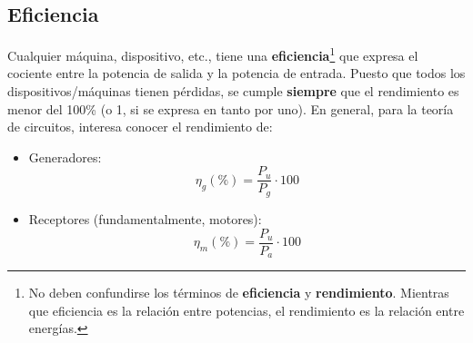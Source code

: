 	\subsection{Eficiencia}
	Cualquier máquina, dispositivo, etc., tiene una
        \textbf{eficiencia}\footnote{No deben confundirse los términos
          de \textbf{eficiencia} y \textbf{rendimiento}. Mientras que
          eficiencia es la relación entre potencias, el rendimiento es
          la relación entre energías.} %
	que expresa el cociente entre la potencia de salida y la
        potencia de entrada. Puesto que todos los
        dispositivos/máquinas tienen pérdidas, se cumple
        \textbf{siempre} que el rendimiento es menor del 100\% (o 1,
        si se expresa en tanto por uno). En general, para la teoría de
        circuitos, interesa conocer el rendimiento de:
	\begin{itemize}
        \item Generadores:
          \begin{equation}
            \boxed{\eta_g (\%) = \frac{P_{u}}{P_{g}}\cdot 100}
          \end{equation}
        \item Receptores (fundamentalmente, motores):
          \begin{equation}
            \boxed{\eta_m (\%) = \frac{P_{u}}{P_{a}}\cdot 100}
          \end{equation}
	\end{itemize}
	
